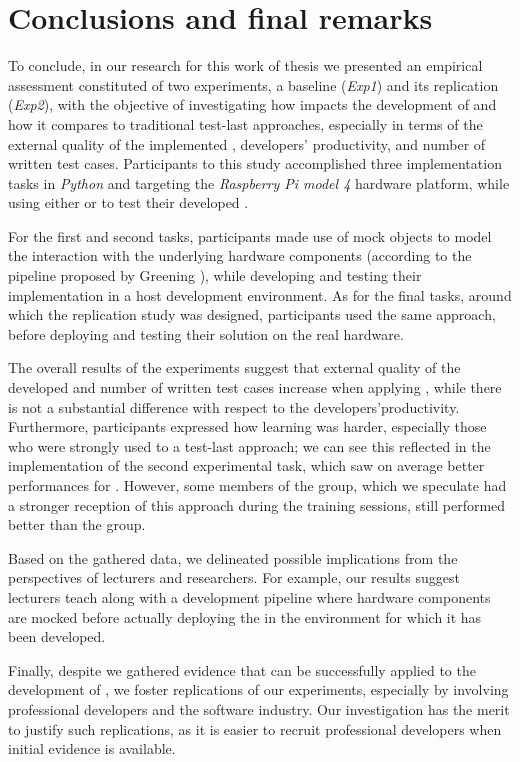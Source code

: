 \chapter{Conclusions and final remarks}
\label{chap:7_conclusions}
To conclude, in our research for this work of thesis we presented an empirical assessment constituted of two experiments, a baseline (\textit{Exp1}) and its replication (\textit{Exp2}), with the objective of investigating how \tdd impacts the development of \ess and how it compares to traditional test-last approaches, especially in terms of the external quality of the implemented \es, developers' productivity, and number of written test cases. 
Participants to this study accomplished three implementation tasks in \textit{Python} and targeting the \textit{Raspberry Pi model 4} hardware platform, while using either \tdd or \notdd to test their developed \ess.

For the first and second tasks, participants made use of mock objects to model the interaction with the underlying hardware components (according to the pipeline proposed by Greening \cite{TDDEC}), while developing and testing their implementation in a host development environment. As for the final tasks, around which the replication study was designed, participants used the same approach, before deploying and testing their solution on the real hardware.

The overall results of the experiments suggest that external quality of the developed \ess and number of written test cases increase when applying \tdd, while there is not a substantial difference with respect to the developers'productivity. Furthermore, participants expressed how learning \tdd was harder, especially those who were strongly used to a test-last approach; we can see this reflected in the implementation of the second experimental task, which saw on average better performances for \notdd. However, some members of the \tdd group, which we speculate had a stronger reception of this approach during the training sessions, still performed better than the \notdd group.

Based on the gathered data, we delineated possible implications from the perspectives of lecturers and researchers. For example, our results suggest lecturers teach \tdd along with a development pipeline where hardware components are mocked before actually deploying the \es in the environment for which it has been developed. 

Finally, despite we gathered evidence that \tdd can be successfully applied to the development of \ess, we foster replications of our experiments, especially by involving professional developers and the software industry. 
Our investigation has the merit to justify such replications, as it is easier to recruit professional developers when initial evidence is available. 
